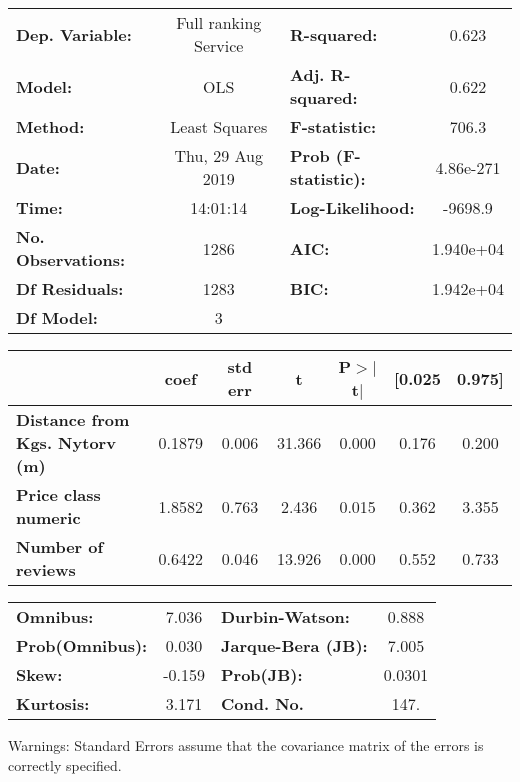 \documentclass{report}
\begin{document}
\begin{center}
\begin{tabular}{lclc}
\toprule
\textbf{Dep. Variable:}                & Full ranking Service & \textbf{  R-squared:         } &     0.623   \\
\textbf{Model:}                        &         OLS          & \textbf{  Adj. R-squared:    } &     0.622   \\
\textbf{Method:}                       &    Least Squares     & \textbf{  F-statistic:       } &     706.3   \\
\textbf{Date:}                         &   Thu, 29 Aug 2019   & \textbf{  Prob (F-statistic):} & 4.86e-271   \\
\textbf{Time:}                         &       14:01:14       & \textbf{  Log-Likelihood:    } &   -9698.9   \\
\textbf{No. Observations:}             &          1286        & \textbf{  AIC:               } & 1.940e+04   \\
\textbf{Df Residuals:}                 &          1283        & \textbf{  BIC:               } & 1.942e+04   \\
\textbf{Df Model:}                     &             3        & \textbf{                     } &             \\
\bottomrule
\end{tabular}
\begin{tabular}{lcccccc}
                                       & \textbf{coef} & \textbf{std err} & \textbf{t} & \textbf{P$>$$|$t$|$} & \textbf{[0.025} & \textbf{0.975]}  \\
\midrule
\textbf{Distance from Kgs. Nytorv (m)} &       0.1879  &        0.006     &    31.366  &         0.000        &        0.176    &        0.200     \\
\textbf{Price class numeric}           &       1.8582  &        0.763     &     2.436  &         0.015        &        0.362    &        3.355     \\
\textbf{Number of reviews}             &       0.6422  &        0.046     &    13.926  &         0.000        &        0.552    &        0.733     \\
\bottomrule
\end{tabular}
\begin{tabular}{lclc}
\textbf{Omnibus:}       &  7.036 & \textbf{  Durbin-Watson:     } &    0.888  \\
\textbf{Prob(Omnibus):} &  0.030 & \textbf{  Jarque-Bera (JB):  } &    7.005  \\
\textbf{Skew:}          & -0.159 & \textbf{  Prob(JB):          } &   0.0301  \\
\textbf{Kurtosis:}      &  3.171 & \textbf{  Cond. No.          } &     147.  \\
\bottomrule
\end{tabular}
\end{center}

Warnings: \newline
 [1] Standard Errors assume that the covariance matrix of the errors is correctly specified.
\end{document}
